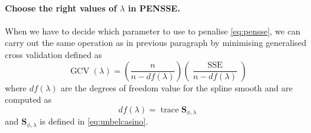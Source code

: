\paragraph{Choose the right values of $\lambda$ in PENSSE.} When we have to decide which parameter to use to penalise \ref{eq:pensse}, we can carry out the same operation as in previous paragraph by minimising generalised cross validation defined as
\begin{equation}
\label{eq:gcv}
    \operatorname{GCV}(\lambda)=\left(\frac{n}{n-d f(\lambda)}\right)\left(\frac{\operatorname{SSE}}{n-d f(\lambda)}\right)
\end{equation}
where $df(\lambda)$ are the degrees of freedom value for the spline smooth and are computed as
\begin{equation}
   df(\lambda)=\operatorname{trace} \mathbf{S}_{\phi, \lambda}
\end{equation}
and $\mathbf{S}_{\phi, \lambda}$ is defined in \ref{eq:unbelcasino}.


